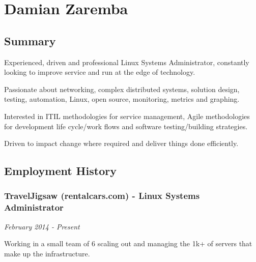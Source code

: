 \section{Damian Zaremba}\label{damian-zaremba}

\subsection{Summary}\label{summary}

Experienced, driven and professional Linux Systems Administrator,
constantly looking to improve service and run at the edge of technology.

Passionate about networking, complex distributed systems, solution
design, testing, automation, Linux, open source, monitoring, metrics and
graphing.

Interested in ITIL methodologies for service management, Agile
methodologies for development life cycle/work flows and software
testing/building strategies.

Driven to impact change where required and deliver things done
efficiently.

\subsection{Employment History}\label{employment-history}

\subsubsection{TravelJigsaw (rentalcars.com) - Linux Systems
Administrator}\label{traveljigsaw-rentalcars.com---linux-systems-administrator}

\emph{February 2014 - Present}

Working in a small team of 6 scaling out and managing the 1k+ of servers
that make up the infrastructure.

